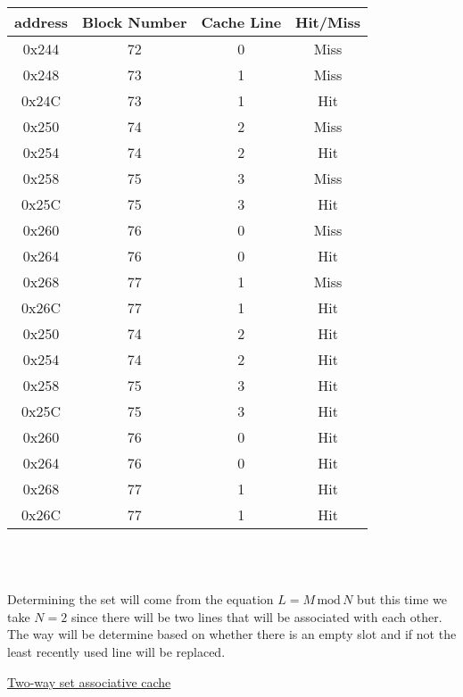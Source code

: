 \documentclass[11pt,reqno]{article}
\begin{document}
\begin{tabular}{| c | c | c | c |}
\hline
address & Block Number & Cache Line & Hit/Miss \\ \hline
0x244 & 72 & 0 & Miss \\ \hline
0x248 & 73 & 1 & Miss \\ \hline
0x24C & 73 & 1 & Hit \\ \hline
0x250 & 74 & 2 & Miss \\ \hline
0x254 & 74 & 2& Hit \\ \hline
0x258 & 75 & 3 & Miss \\ \hline
0x25C & 75 & 3 & Hit \\ \hline
0x260 & 76 & 0 & Miss \\ \hline
0x264 & 76 & 0 & Hit \\ \hline
0x268 & 77 & 1 & Miss \\ \hline
0x26C & 77 & 1 & Hit \\ \hline
0x250 & 74 & 2 & Hit \\ \hline
0x254 & 74 & 2 & Hit \\ \hline
0x258 & 75 & 3 & Hit \\ \hline
0x25C & 75 & 3 & Hit \\ \hline
0x260 & 76 & 0 & Hit \\ \hline
0x264 & 76 & 0 & Hit \\ \hline
0x268 & 77 & 1& Hit \\ \hline
0x26C & 77 & 1 & Hit \\ \hline
\end{tabular}\\
\newpage 

\noindent{}\\ 

Determining the set will come from the equation $L = M \, \text{mod} \, N$ but this time we take $N = 2$ since there will be two lines that will be associated with each other. The way will be determine based on whether there is an empty slot and if not the least recently used line will be replaced.

\noindent \underline{Two-way set associative cache}\\
\end{document}
